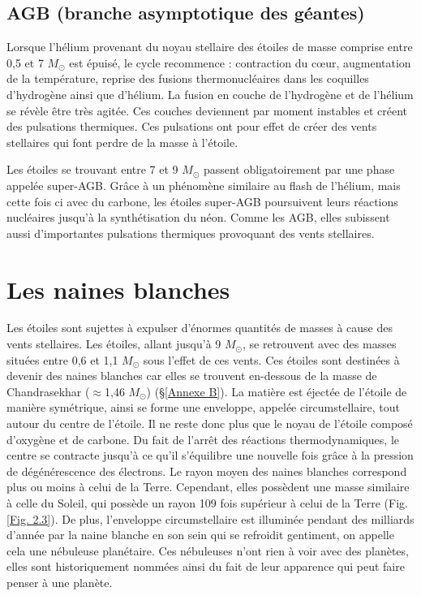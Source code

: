 \subsection{AGB (branche asymptotique des géantes)}\label{2.2.2}

Lorsque l'hélium provenant du noyau stellaire des étoiles de masse comprise entre 0,5 et 7 $M_\odot$ est épuisé, le cycle recommence : contraction du cœur, augmentation de la température, reprise des fusions thermonucléaires dans les coquilles d’hydrogène ainsi que d’hélium. La fusion en couche de l’hydrogène et de l’hélium se révèle être très agitée. Ces couches deviennent par moment instables et créent des pulsations thermiques. Ces pulsations ont pour effet de créer des vents stellaires qui font perdre de la masse à l’étoile.\smallskip

Les étoiles se trouvant entre 7 et 9 $M_\odot$ passent obligatoirement par une phase appelée super-AGB. Grâce à un phénomène similaire au flash de l'hélium, mais cette fois ci avec du carbone, les étoiles super-AGB poursuivent leurs réactions nucléaires jusqu'à la synthétisation du néon. Comme les AGB, elles subissent aussi d'importantes pulsations thermiques provoquant des vents stellaires.

\section{Les naines blanches}\label{2.3}

Les étoiles sont sujettes à expulser d’énormes quantités de masses à cause des vents stellaires. Les étoiles, allant jusqu’à 9 $M_\odot$, se retrouvent avec des masses situées entre 0,6 et 1,1 $M_\odot$ sous l’effet de ces vents. Ces étoiles sont destinées à devenir des naines blanches car elles se trouvent en-dessous de la masse de Chandrasekhar ($\approx$1,46 $M_\odot$) (§\ref{Annexe B}). La matière est éjectée de l’étoile de manière symétrique, ainsi se forme une enveloppe, appelée circumstellaire, tout autour du centre de l’étoile. Il ne reste donc plus que le noyau de l’étoile composé d’oxygène et de carbone. Du fait de l’arrêt des réactions thermodynamiques, le centre se contracte jusqu’à ce qu’il s’équilibre une nouvelle fois grâce à la pression de dégénérescence des électrons. Le rayon moyen des naines blanches correspond plus ou moins à celui de la Terre. Cependant, elles possèdent une masse similaire à celle du Soleil, qui possède un rayon 109 fois supérieur à celui de la Terre (Fig. \ref{Fig. 2.3}). De plus, l’enveloppe circumstellaire est illuminée pendant des milliards d’année par la naine blanche en son sein qui se refroidit gentiment, on appelle cela une nébuleuse planétaire. Ces nébuleuses n’ont rien à voir avec des planètes, elles sont historiquement nommées ainsi du fait de leur apparence qui peut faire penser à une planète.\newpage 

